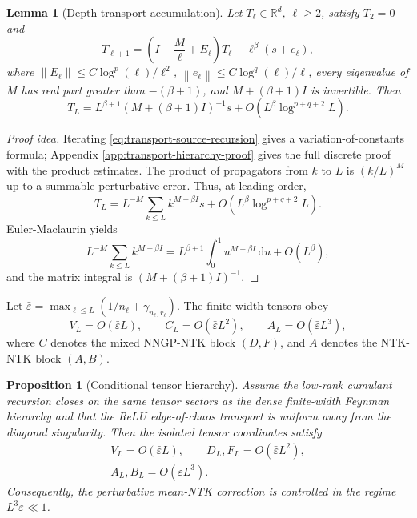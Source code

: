 \documentclass{article}
\newtheorem{proposition}[theorem]{Proposition}
\newtheorem{lemma}[theorem]{Lemma}
\newcommand{\R}{\mathbb R}
\newcommand{\barE}{\bar\varepsilon}
\newcommand{\dd}{\mathrm d}
\newcommand{\norm}[1]{\left\lVert #1\right\rVert}
\begin{document}
\begin{lemma}[Depth-transport accumulation]
\label{lem:transport-source}
Let \(T_\ell\in\R^d\), \(\ell\ge2\), satisfy \(T_2=0\) and
\begin{equation}
T_{\ell+1}
=\left(I-\frac{M}{\ell}+E_\ell\right)T_\ell+\ell^\beta(s+e_\ell),
\label{eq:transport-source-recursion}
\end{equation}
where \(\norm{E_\ell}\le C\log^p(\ell)/\ell^2\), \(\norm{e_\ell}\le C\log^q(\ell)/\ell\), every eigenvalue of \(M\) has real part greater than \(-(\beta+1)\), and \(M+(\beta+1)I\) is invertible. Then
\begin{equation}
T_L
=L^{\beta+1}\left(M+(\beta+1)I\right)^{-1}s
+O\left(L^\beta\log^{p+q+2}L\right).
\label{eq:transport-source-solution}
\end{equation}
\end{lemma}

\begin{proof}[Proof idea]
Iterating \eqref{eq:transport-source-recursion} gives a variation-of-constants formula; Appendix \ref{app:transport-hierarchy-proof} gives the full discrete proof with the product estimates. The product of propagators from \(k\) to \(L\) is \((k/L)^M\) up to a summable perturbative error. Thus, at leading order,
\[
T_L=L^{-M}\sum_{k\le L} k^{M+\beta I}s+O(L^\beta\log^{p+q+2}L).
\]
Euler-Maclaurin yields
\[
L^{-M}\sum_{k\le L} k^{M+\beta I}
=L^{\beta+1}\int_0^1u^{M+\beta I}\,\dd u+O(L^\beta),
\]
and the matrix integral is \((M+(\beta+1)I)^{-1}\).
\end{proof}

Let \(\barE=\max_{\ell\le L}(1/n_\ell+\gamma_{n_\ell,r_\ell})\). The finite-width tensors obey
\begin{equation}
V_L=O(\barE L),\qquad C_L=O(\barE L^2),\qquad A_L=O(\barE L^3),
\label{eq:main-scales}
\end{equation}
where \(C\) denotes the mixed NNGP-NTK block \((D,F)\), and \(A\) denotes the NTK-NTK block \((A,B)\).

\begin{proposition}[Conditional tensor hierarchy]
\label{prop:tensor-hierarchy}
Assume the low-rank cumulant recursion closes on the same tensor sectors as the dense finite-width Feynman hierarchy and that the ReLU edge-of-chaos transport is uniform away from the diagonal singularity. Then the isolated tensor coordinates satisfy
\begin{equation}
\begin{gathered}
V_L=O(\barE L),\qquad
D_L,F_L=O(\barE L^2),\\
A_L,B_L=O(\barE L^3).
\end{gathered}
\label{eq:tensor-hierarchy}
\end{equation}
Consequently, the perturbative mean-NTK correction is controlled in the regime \(L^3\barE\ll 1\).
\end{proposition}
\end{document}
